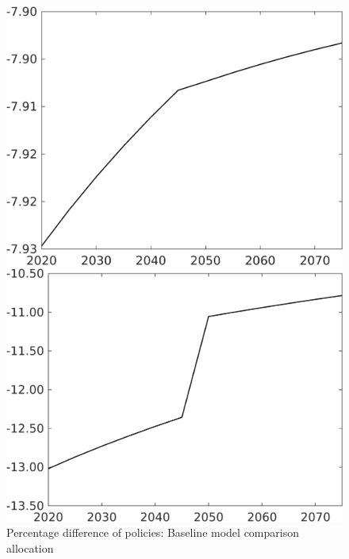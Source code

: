 \documentclass[12pt]{article}
\begin{document}
\begin{figure}[h!!]
	\centering
	\caption{Percentage difference of policies: Baseline model comparison allocation}\label{fig:Pertauf_nsk0_xgr12}
	
	\begin{minipage}[]{0.32\textwidth}
		\includegraphics[width=1\textwidth]{../../codding_model/own_basedOnFried/optimalPol_010922_revision/figures/all_13Sept22/CompTaufPER_bytaul_Reg0_N_spillover0_nsk0_xgr1_knspil0_sep0_LFlimit1_emsbase0_countec0_GovRev0_etaa0.79_lgd0.png}
	\end{minipage}	
	\begin{minipage}[]{0.32\textwidth}
		\includegraphics[width=1\textwidth]{../../codding_model/own_basedOnFried/optimalPol_010922_revision/figures/all_13Sept22/CompTaufPER_bytaul_Reg0_G_spillover0_nsk0_xgr1_knspil0_sep0_LFlimit1_emsbase0_countec0_GovRev0_etaa0.79_lgd0.png}

\end{minipage}
\end{figure}
\end{document}
